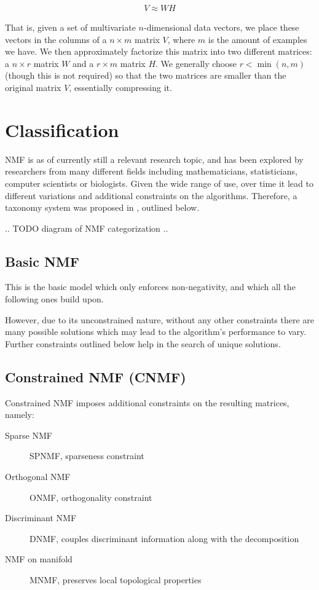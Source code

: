 \begin{align}
V \approx WH
\end{align}

That is, given a set of multivariate $n$-dimensional data vectors, we place these vectors in the columns of a $n \times m$ matrix $V$, where $m$ is the amount of examples we have. We then approximately factorize this matrix into two different matrices: a $n \times r$ matrix $W$ and a $r \times m$ matrix $H$. We generally choose $r < \min(n,m)$ (though this is not required) so that the two matrices are smaller than the original matrix $V$, essentially compressing it. \cite{nmf_algorithms}

\section{Classification}
NMF is as of currently still a relevant research topic, and has been explored by researchers from many different fields including mathematicians, statisticians, computer scientists or biologists. Given the wide range of use, over time it lead to different variations and additional constraints on the algorithms. Therefore, a taxonomy system was proposed in \cite{wang_zhang_2013}, outlined below.

.. TODO diagram of NMF categorization ..

\subsection{Basic NMF}
This is the basic model which only enforces non-negativity, and which all the following ones build upon.

However, due to its unconstrained nature, without any other constraints there are many possible solutions  which may lead to the algorithm's performance to vary. Further constraints outlined below help in the search of unique solutions.

\subsection{Constrained NMF (CNMF)}
Constrained NMF imposes additional constraints on the resulting matrices, namely:

\begin{description}
	\item[Sparse NMF] SPNMF, sparseness constraint
	\item[Orthogonal NMF] ONMF, orthogonality constraint
	\item[Discriminant NMF] DNMF, couples discriminant information along with the decomposition
	\item[NMF on manifold] MNMF, preserves local topological properties
\end{description}

